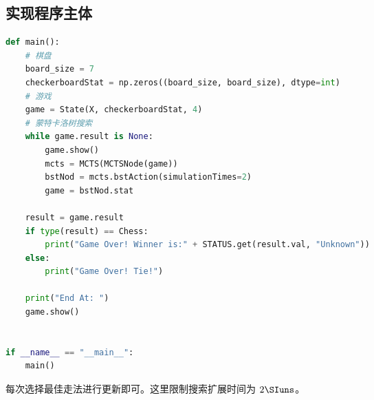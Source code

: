 \subsection{实现程序主体}
\begin{lstlisting}[language=python]
def main():
    # 棋盘
    board_size = 7
    checkerboardStat = np.zeros((board_size, board_size), dtype=int)
    # 游戏
    game = State(X, checkerboardStat, 4)
    # 蒙特卡洛树搜索
    while game.result is None:
        game.show()
        mcts = MCTS(MCTSNode(game))
        bstNod = mcts.bstAction(simulationTimes=2)
        game = bstNod.stat

    result = game.result
    if type(result) == Chess:
        print("Game Over! Winner is:" + STATUS.get(result.val, "Unknown"))
    else:
        print("Game Over! Tie!")

    print("End At: ")
    game.show()


if __name__ == "__main__":
    main()

\end{lstlisting}
每次选择最佳走法进行更新即可。这里限制搜索扩展时间为 $2\SIuns$。